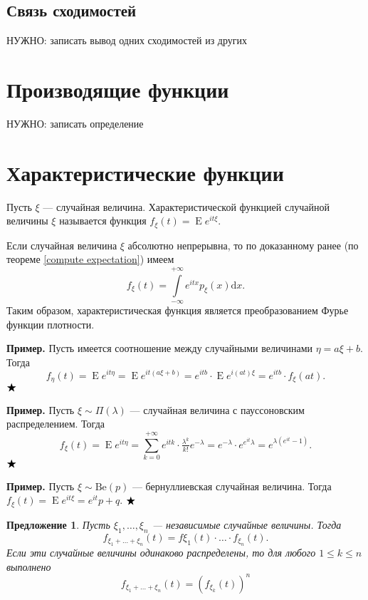 \documentclass[12pt]{article}
\newtheorem{proposition}[theorem]{Предложение}
\numberwithin{theorem}{section}
\theoremstyle{definition}
\newenvironment{example}{\indent \textbf{Пример.}}{$ \hfill \bigstar $}
\newcommand{\defin}[2]{\hypertarget{#2}{{\color{red} #1}}}
\newcommand{\expect}{\operatorname{E}}
\newcommand{\diff}{\mathrm{d}}
\newcommand{\TODO}[1]{\textcolor{todocolor}{НУЖНО: #1}}
\begin{document}
	\subsection{Связь сходимостей}
	
	\TODO{записать вывод одних сходимостей из других}
	
	\section{Производящие функции}
	
	\TODO{записать определение}
	
	\section{Характеристические функции}
	
	Пусть $ \xi $ --- случайная величина. 
	\defin{Характеристической функцией случайной величины $ \xi $}{characteristic-function} 
	называется функция $ f_\xi(t) = \expect e^{it\xi} $.
	
	Если случайная величина $ \xi $ абсолютно непрерывна, то по доказанному ранее 
	(по теореме \ref{compute expectation}) имеем 
	$$ f_\xi(t) = \int\limits_{-\infty}^{+\infty} e^{itx}p_\xi(x) \diff x. $$
	Таким образом, характеристическая функция является преобразованием Фурье функции плотности.
	
	\begin{example}
		Пусть имеется соотношение между случайными величинами $ \eta = a\xi + b $.
		Тогда
		$$ f_\eta(t) = \expect e^{it\eta} = \expect e^{it(a\xi + b)} = e^{itb} \cdot \expect e^{i(at)\xi}
		= e^{itb} \cdot f_\xi(at). $$
	\end{example}
	
	\begin{example}
		Пусть $ \xi \sim \Pi(\lambda) $ --- случайная величина с пауссоновским распределением.
		Тогда
		$$ f_\xi(t) = \expect e^{it\eta} = \sum\limits_{k = 0}^{+\infty} e^{itk}\cdot \tfrac{\lambda^k}{k!}e^{-\lambda}
		= e^{-\lambda} \cdot e^{e^{it}\lambda} = e^{\lambda(e^{it} - 1)}. $$
	\end{example}
	
	\begin{example}
		Пусть $ \xi \sim \mathrm{Be}(p) $ --- бернуллиевская случайная величина.
		Тогда $ f_{\xi}(t) = \expect e^{it\xi} = e^{it}p + q $.
	\end{example}
	
	\begin{proposition}
		Пусть $ \xi_1, \ldots, \xi_n $ --- независимые случайные величины.
		Тогда $$ f_{\xi_1 + \ldots + \xi_n}(t) = f{\xi_1}(t) \cdot \ldots \cdot f_{\xi_n}(t). $$
		Если эти случайные величины одинаково распределены,
		то для любого $ 1 \leqslant k \leqslant n $ выполнено
		$$ f_{\xi_1 + \ldots + \xi_n}(t) = (f_{\xi_k}(t))^n $$
	\end{proposition}
	
\end{document}

